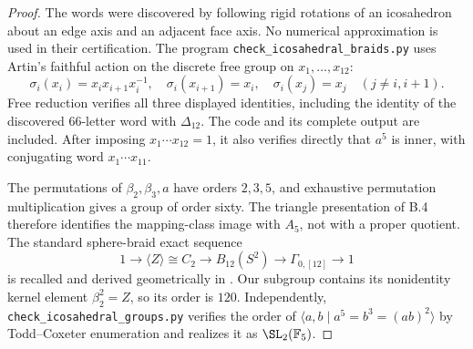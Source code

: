 \begin{proof}
The words were discovered by following rigid rotations of an icosahedron
about an edge axis and an adjacent face axis. No numerical approximation
is used in their certification. The program
\texttt{check\_icosahedral\_braids.py} uses Artin's faithful action on
the discrete free group on \(x_1,\ldots,x_{12}\):
\[
 \sigma_i(x_i)=x_ix_{i+1}x_i^{-1},\quad
 \sigma_i(x_{i+1})=x_i,\quad
 \sigma_i(x_j)=x_j\quad(j\ne i,i+1).
\]
Free reduction verifies all three displayed identities, including the
identity of the discovered 66-letter word with \(\Delta_{12}\).
The code and its complete output are included. After imposing
\(x_1\cdots x_{12}=1\), it also verifies directly that \(a^5\)
is inner, with conjugating word \(x_1\cdots x_{11}\).

The permutations of \(\beta_2,\beta_3,a\) have orders \(2,3,5\),
and exhaustive permutation multiplication gives a group of order
sixty. The triangle presentation of B.4 therefore identifies the
mapping-class image with \(A_5\), not with a proper quotient.
The standard sphere-braid exact sequence
\[
 1\longrightarrow\langle Z\rangle\cong C_2
 \longrightarrow B_{12}(S^2)
 \longrightarrow\Gamma_{0,[12]}\longrightarrow1
\]
is recalled and derived geometrically in
\citet[Sections 1--3]{GoncalvesGuaschi2008}.
Our subgroup contains its nonidentity kernel element \(\beta_2^2=Z\),
so its order is \(120\). Independently,
\texttt{check\_icosahedral\_groups.py} verifies the order of
\(\langle a,b\mid a^5=b^3=(ab)^2\rangle\) by Todd--Coxeter
enumeration and realizes it as \(\SL_2(\mathbb F_5)\).


\end{proof}
